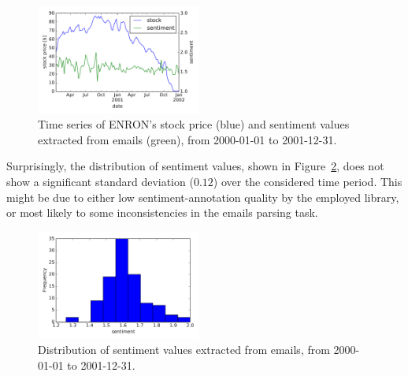 \documentclass{vldb}
\begin{document}
\begin{figure}[h!]
\centering
\includegraphics[width=0.48\textwidth]{imgs/sentiment_vs_stock}
\caption{Time series of ENRON's stock price (blue) and sentiment values extracted from emails (green), from 2000-01-01 to 2001-12-31.}
\label{fig:sentiment_vs_stock}
\end{figure}

Surprisingly, the distribution of sentiment values, shown in Figure~\ref{fig:sentiment_dist_hist}, does not show a significant standard deviation ($0.12$) over the considered time period.
This might be due to either low sentiment-annotation quality by the employed library, or most likely to some inconsistencies in the emails parsing task.

\begin{figure}[h!]
\centering
\includegraphics[width=0.48\textwidth]{imgs/sentiment_dist_hist}
\caption{Distribution of sentiment values extracted from emails, from 2000-01-01 to 2001-12-31.}
\label{fig:sentiment_dist_hist}
\end{figure}
\end{document}
